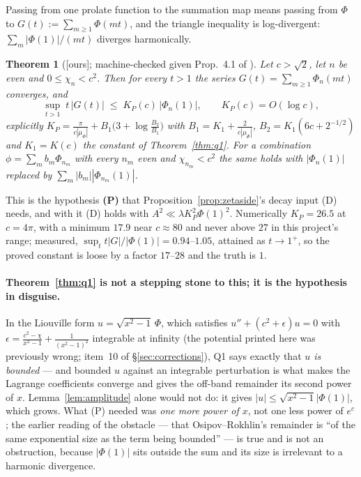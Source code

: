 \documentclass[11pt,a4paper]{article}
\theoremstyle{plain}
\newtheorem{theorem}{Theorem}[section]
\theoremstyle{definition}
\theoremstyle{remark}
\newcommand{\ours}{{\normalfont\sffamily\footnotesize[ours]}}
\newcommand{\file}[1]{\path{#1}}
\begin{document}
Passing from one prolate function to the summation map means passing from
$\Phi$ to $G(t):=\sum_{m\ge1}\Phi(mt)$, and the triangle inequality is
log-divergent: $\sum_m|\Phi(1)|/(mt)$ diverges harmonically.

\begin{theorem}[\ours; machine-checked given Prop.~4.1 of
\file{dilate-sum.md}]\label{thm:q2}
Let $c>\sqrt2$, let $n$ be even and $0\le\chi_n<c^2$.  Then for every $t>1$ the
series $G(t)=\sum_{m\ge1}\Phi_n(mt)$ converges, and
\[
  \sup_{t>1}\;t\,|G(t)|\;\le\;K_P(c)\,|\Phi_n(1)|,\qquad K_P(c)=O(\log c),
\]
explicitly $K_P=\frac{\pi}{c|\mu_\Phi|}+B_1\big(3+\log\frac{B_2}{B_1}\big)$ with
$B_1=K_1+\frac{2}{c|\mu_\Phi|}$, $B_2=K_1(6c+2^{-1/2})$ and $K_1=K(c)$ the
constant of Theorem~\ref{thm:q1}.  For a combination
$\phi=\sum_mb_m\Phi_{n_m}$ with every $n_m$ even and $\chi_{n_m}<c^2$ the same
holds with $|\Phi_n(1)|$ replaced by $\sum_m|b_m||\Phi_{n_m}(1)|$.
\end{theorem}

\noindent This is the hypothesis \textbf{(P)} that
Proposition~\ref{prop:zetaside}'s decay input (D) needs, and with it (D) holds
with $A^2\ll\lambda K_P^2\Phi(1)^2$.  Numerically $K_P=26.5$ at $c=4\pi$, with a
minimum $17.9$ near $c\approx80$ and never above $27$ in this project's range;
measured, $\sup_t t|G|/|\Phi(1)|=0.94$--$1.05$, attained as $t\to1^+$, so the
proved constant is loose by a factor $17$--$28$ and the truth is $1$.

\paragraph{Theorem~\ref{thm:q1} is not a stepping stone to this; it is the
hypothesis in disguise.}  In the Liouville form $u=\sqrt{x^2-1}\,\Phi$, which
satisfies $u''+(c^2+\epsilon)u=0$ with
$\epsilon=\frac{c^2-\chi}{x^2-1}+\frac{1}{(x^2-1)^2}$ integrable at infinity
(the potential printed here was previously wrong; item~10 of
\S\ref{sec:corrections}), Q1 says exactly that
\emph{$u$ is bounded} --- and bounded $u$ against an integrable perturbation is
what makes the Lagrange coefficients converge and gives the off-band remainder
its second power of $x$.  Lemma~\ref{lem:amplitude} alone would not do: it gives
$|u|\le\sqrt{x^2-1}|\Phi(1)|$, which grows.  What (P) needed was \emph{one more
power of $x$}, not one less power of $e^{c}$; the earlier reading of the
obstacle --- that Osipov--Rokhlin's remainder is ``of the same exponential size
as the term being bounded'' --- is true and is not an obstruction, because
$|\Phi(1)|$ sits outside the sum and its size is irrelevant to a harmonic
divergence.
\end{document}
